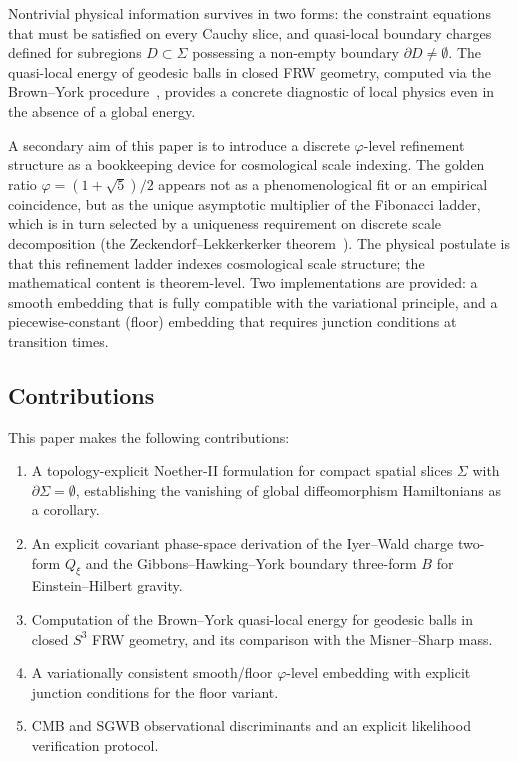 \documentclass[12pt,a4paper]{article}
\newcommand{\Sig}{\Sigma}           %
\newcommand{\pa}{\partial}          %
\newcommand{\Qxi}{Q_\xi}
\begin{document}
Nontrivial physical information survives in two forms: the
constraint equations that must be satisfied on every Cauchy
slice, and quasi-local boundary charges defined for
subregions $D\subset\Sig$ possessing a non-empty boundary
$\pa D \neq \emptyset$. The quasi-local energy of geodesic
balls in closed FRW geometry, computed via the Brown--York
procedure~\cite{BrownYork1993}, provides a concrete
diagnostic of local physics even in the absence of a
global energy.

A secondary aim of this paper is to introduce a discrete
$\varphi$-level refinement structure as a bookkeeping
device for cosmological scale indexing. The golden ratio
$\varphi = (1+\sqrt{5})/2$ appears not as a phenomenological
fit or an empirical coincidence, but as the unique
asymptotic multiplier of the Fibonacci ladder, which is
in turn selected by a uniqueness requirement on discrete
scale decomposition (the Zeckendorf--Lekkerkerker
theorem~\cite{Lekkerkerker1951,Keller1972}). The physical
postulate is that this refinement ladder indexes cosmological
scale structure; the mathematical content is theorem-level.
Two implementations are provided: a smooth embedding that
is fully compatible with the variational principle, and a
piecewise-constant (floor) embedding that requires junction
conditions at transition times.

\subsection*{Contributions}

This paper makes the following contributions:
\begin{enumerate}
\item[(i)] A topology-explicit Noether-II formulation for
  compact spatial slices $\Sig$ with $\pa\Sig = \emptyset$,
  establishing the vanishing of global diffeomorphism
  Hamiltonians as a corollary.
\item[(ii)] An explicit covariant phase-space derivation of
  the Iyer--Wald charge two-form $\Qxi$ and the
  Gibbons--Hawking--York boundary three-form $B$ for
  Einstein--Hilbert gravity.
\item[(iii)] Computation of the Brown--York quasi-local
  energy for geodesic balls in closed $S^3$ FRW geometry,
  and its comparison with the Misner--Sharp mass.
\item[(iv)] A variationally consistent smooth/floor
  $\varphi$-level embedding with explicit junction
  conditions for the floor variant.
\item[(v)] CMB and SGWB observational discriminants and
  an explicit likelihood verification protocol.
\end{enumerate}
\end{document}
